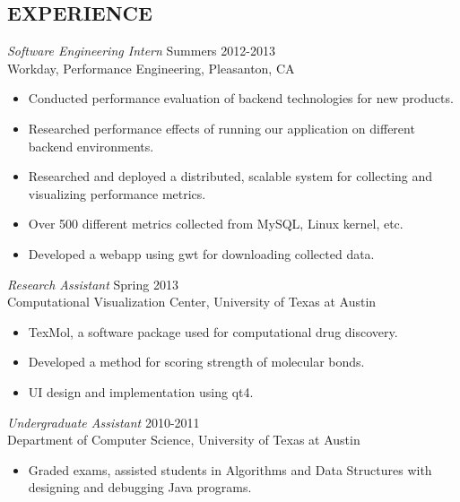 \documentclass[line,margin]{res}
\begin{document}
\begin{resume}
\section{EXPERIENCE} {\sl Software Engineering Intern} \hfill Summers 2012-2013 \\
                Workday, 
                Performance Engineering, Pleasanton, CA
                 \begin{itemize}  \itemsep -2pt %
                 \item Conducted performance evaluation of backend technologies for new products.
                 \item Researched performance effects of running our application on different backend environments.
                 \item Researched and deployed a distributed, scalable system for collecting and visualizing performance metrics.
								 \item Over 500 different metrics collected from MySQL, Linux kernel, etc.
                 \item Developed a webapp using gwt for downloading collected data.
                \end{itemize}

                {\sl Research Assistant } \hfill Spring 2013 \\
                Computational Visualization Center, University of Texas at Austin
                \begin{itemize} \itemsep -2pt
                    \item TexMol, a software package used for computational drug discovery.
                    \item Developed a method for scoring strength of molecular bonds.
                    \item UI design and implementation using qt4.
                 \end{itemize}
        
 
                {\sl Undergraduate Assistant} \hfill        2010-2011 \\
                Department of Computer Science, University of Texas at Austin
                  \begin{itemize} \itemsep -2pt
                   \item Graded exams, assisted students in Algorithms and Data Structures with designing and debugging Java programs.
                   \end{itemize} 
 

\end{resume}
\end{document}
